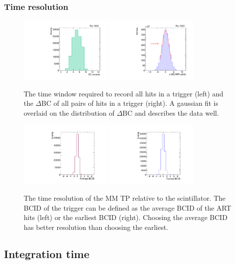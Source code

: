 \subsubsection{Time resolution}

\begin{figure}[!htpb]
  \begin{center}
    \includegraphics[width=0.4\textwidth]{figures/gbtanalysis3522/artwin_lin.pdf}
    \includegraphics[width=0.4\textwidth]{figures/gbtanalysis3522/artrpairs_lin.pdf}
  \end{center}
  \vspace{-10pt}
  \caption{The time window required to record all hits in a trigger (left) and the $\Delta\text{BC}$ of all pairs of hits in a trigger (right). A gaussian fit is overlaid on the distribution of $\Delta\text{BC}$ and describes the data well.}
  \label{fig:time}
\end{figure}

\begin{figure}[!htpb]
  \begin{center}
    \includegraphics[width=0.4\textwidth]{figures/gbtanalysis3522/avg_BCID.pdf}
    \includegraphics[width=0.4\textwidth]{figures/gbtanalysis3522/earliest_BCID.pdf}
  \end{center}
  \vspace{-10pt}
  \caption{The time resolution of the MM TP relative to the scintillator. The BCID of the trigger can be defined as the average BCID of the ART hits (left) or the earliest BCID (right). Choosing the average BCID has better resolution than choosing the earliest.}
  \label{fig:timeres}
\end{figure}

\subsection{Integration time}
\label{sec:perf-integ}

